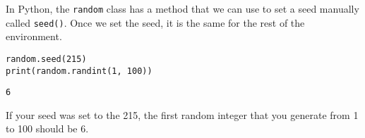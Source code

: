 In Python, the \verb|random| class has a method that we can use to set a seed manually called \verb|seed()|. Once we set the seed, it is the same for the rest of the environment.\par
\begin{lstlisting}[style=pippython]
random.seed(215)
print(random.randint(1, 100))
\end{lstlisting}
\begin{lstlisting}[style=none]
6
\end{lstlisting}
If your seed was set to the 215, the first random integer that you generate from 1 to 100 should be 6.